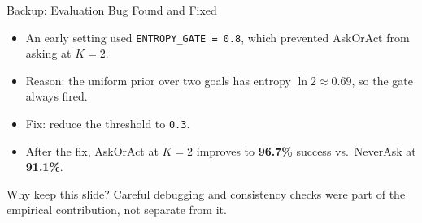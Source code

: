 \documentclass[aspectratio=169,10pt]{beamer}
\begin{document}
\begin{frame}{Backup: Evaluation Bug Found and Fixed}
  \begin{itemize}
    \item An early setting used \texttt{ENTROPY\_GATE = 0.8}, which prevented AskOrAct from asking at $K{=}2$.
    \item Reason: the uniform prior over two goals has entropy $\ln 2 \approx 0.69$, so the gate always fired.
    \item Fix: reduce the threshold to \texttt{0.3}.
    \item After the fix, AskOrAct at $K{=}2$ improves to \textbf{96.7\%} success vs.\ NeverAsk at \textbf{91.1\%}.
  \end{itemize}
  \vspace{0.6em}
  \begin{block}{Why keep this slide?}
    Careful debugging and consistency checks were part of the empirical contribution, not separate from it.
  \end{block}
\end{frame}
\end{document}
